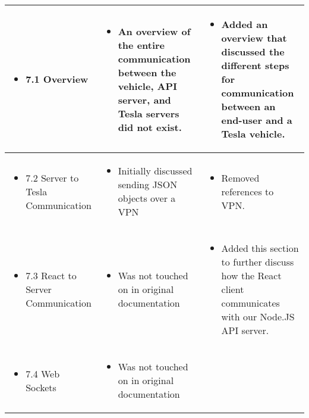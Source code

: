 \documentclass[onecolumn, draftclsnofoot,10pt, compsoc]{IEEEtran}
\begin{document}
\begin{longtable}{p{} | p{} | p{}}
\begin{itemize}
            \item 7.1 Overview
        \end{itemize}
        & \begin{itemize}
            \item An overview of the entire communication between the vehicle, API server, and Tesla servers did not exist.
        \end{itemize}
        & \begin{itemize}
            \item Added an overview that discussed the different steps for communication between an end-user and a Tesla vehicle.
        \end{itemize}
        \\\hline
        \begin{itemize}
            \item 7.2 Server to Tesla Communication
        \end{itemize}
        & \begin{itemize}
            \item Initially discussed sending JSON objects over a VPN
        \end{itemize}
        & \begin{itemize}
            \item Removed references to VPN.
        \end{itemize}
        \\\hline
        \begin{itemize}
            \item 7.3 React to Server Communication
        \end{itemize}
        & \begin{itemize}
            \item Was not touched on in original documentation
        \end{itemize}
        & \begin{itemize}
            \item Added this section to further discuss how the React client communicates with our Node.JS API server.
        \end{itemize}
        \\\hline
        \begin{itemize}
            \item 7.4 Web Sockets
        \end{itemize}
        & \begin{itemize}
            \item Was not touched on in original documentation

\end{itemize}
\end{longtable}
\end{document}
